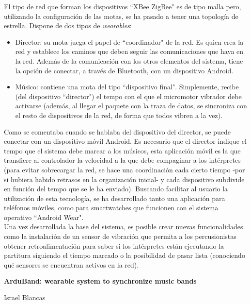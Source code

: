 El tipo de red que forman los dispositivos ``XBee ZigBee" es de tipo malla pero, utilizando la configuración
de las motas, se ha pasado a tener una topología de estrella. Dispone de dos tipos de  \textit{wearables}:
  \begin{itemize}
  \item Director: su mota juega el papel de ``coordinador" de la red. Es quien crea la red y establece los caminos que deben seguir las comunicaciones que haya en la red. Además de la comunicación con los otros elementos del sistema, tiene la opción de conectar, a través de Bluetooth, con un dispositivo Android.
  \item Músico: contiene una mota del tipo ``dispositivo final". Simplemente, recibe (del dispositivo ``director") el tempo con el que el micromotor vibrador debe activarse (además, al llegar el paquete con la traza de datos, se sincroniza con el resto de dispositivos de la red, de forma que todos vibren a la vez).
  \end{itemize}

Como se comentaba cuando se hablaba del dispositivo del director, se puede conectar
con un dispositivo móvil Android. Es necesario que el director indique el tempo que el
sistema debe marcar a los músicos, esta aplicación móvil es la que transfiere al controlador la
velocidad a la que debe compaginar a los intérpretes (para evitar sobrecargar la red, se hace una
coordinación cada cierto tiempo -por si hubiera habido retrasos en la organización inicial- y cada
dispositivo subdivide en función del tempo que se le ha enviado). Buscando facilitar al usuario la utilización
de esta tecnología, se ha desarrollado tanto una aplicación para teléfonos móviles, como para smartwatches
que funcionen con el sistema operativo ``Android Wear".\\

Una vez desarrollada la base del sistema, es posible crear nuevas funcionalidades como la instalación de un
sensor de vibración que permita a los percusionistas obtener retroalimentación para saber si los intérpretes
están ejecutando la partitura siguiendo el tiempo marcado o la posibilidad de pasar lista (conociendo qué sensores
se encuentran activos en la red).\\

\cleardoublepage


\thispagestyle{empty}


\begin{center}
{\large\bfseries ArduBand: wearable system to synchronize music bands}\\
\end{center}
\begin{center}
Israel Blancas\\
\end{center}

